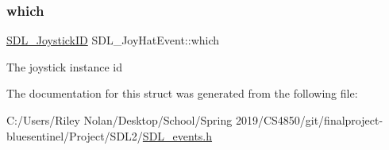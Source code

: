 \subsubsection{\texorpdfstring{which}{which}}
{\footnotesize\ttfamily \mbox{\hyperlink{_s_d_l__joystick_8h_a3c3d32500cb08f76ee8077983912c0bd}{S\+D\+L\+\_\+\+Joystick\+ID}} S\+D\+L\+\_\+\+Joy\+Hat\+Event\+::which}

The joystick instance id 

The documentation for this struct was generated from the following file\+:\begin{DoxyCompactItemize}
\item 
C\+:/\+Users/\+Riley Nolan/\+Desktop/\+School/\+Spring 2019/\+C\+S4850/git/finalproject-\/bluesentinel/\+Project/\+S\+D\+L2/\mbox{\hyperlink{_s_d_l__events_8h}{S\+D\+L\+\_\+events.\+h}}\end{DoxyCompactItemize}
